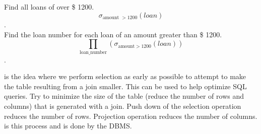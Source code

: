 \documentclass{article}
\begin{document}
\begin{example}
  Find all loans of over \$ 1200. $$\sigma_{\textrm{amount } > 1200}(loan)$$ . \\ 

  Find the loan number for each loan of an amount greater than \$ 1200. $$\prod_{\textrm{loan\_number}}(\sigma_{\textrm{amount}>1200}(loan))$$ . 
\end{example}

 is the idea where we perform selection as early as possible to attempt to make the table resulting from a join smaller. This can be used to help optimize SQL queries. Try to minimize the size of the table (reduce the number of rows and columns) that is generated with a join. Push down of the selection operation reduces the number of rows. Projection operation reduces the number of columns.  is this process and is done by the DBMS. 
\end{document}
